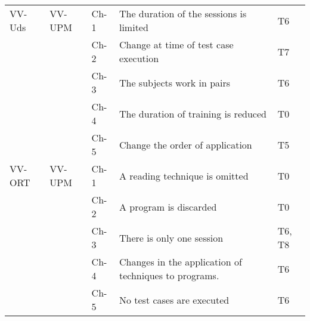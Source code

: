 \begin{table}
\begin{minipage}{6cm}
\begin{tabular}{| l | l | l |p{6cm} | p{1cm}|}
VV-Uds & VV-UPM & Ch-1 & The duration of the sessions is limited & T6 \\
~ & ~ & Ch-2 &  Change at time of test case execution & T7 \\
~ & ~ & Ch-3 &  The subjects work in pairs & T6 \\
~ & ~ & Ch-4 &  The duration of training is reduced & T0 \\
~ & ~ & Ch-5 &  Change the order of application & T5 \\ \hline
VV-ORT & VV-UPM & Ch-1 &  A reading technique is omitted & T0 \\
~ & ~ & Ch-2 &  A program is discarded & T0 \\
~ & ~ & Ch-3 &  There is only one session & T6, T8 \\
~ & ~ & Ch-4 &  Changes in the application of techniques to programs. & T6 \\
~ & ~ & Ch-5 &  No test cases are executed & T6 \\


\hline

\end{tabular}
\end{minipage}


\end{table}



